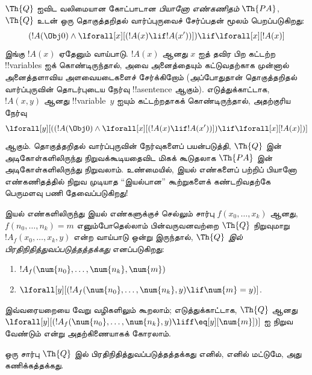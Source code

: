 \documentclass[../../../include/open-logic-section]{subfiles}
\begin{document}
$\Th{Q}$ ஐவிட வலிமையான கோட்பாடான \emph{பியானோ எண்கணிதம்} $\Th{PA}$,
$\Th{Q}$ உடன் ஒரு தொகுத்தறிதல் வார்ப்புருவைச் சேர்ப்பதன் மூலம் பெறப்படுகிறது:
\[
(!A(\Obj 0) \land \lforall[x][(!A(x) \lif !A(x'))]) \lif \lforall[x][!A(x)]
\]
இங்கு $!A(x)$ ஏதேனும் வாய்பாடு. $!A(x)$ ஆனது $x$ ஐத் தவிர பிற கட்டற்ற
!!{variable}s ஐக் கொண்டிருந்தால், அவை அனைத்தையும் கட்டுவதற்காக முன்னால்
அனைத்தளாவிய அளவையடைகளைச் சேர்க்கிறோம் (அப்போதுதான் தொகுத்தறிதல்
வார்ப்புருவின் தொடர்புடைய நேர்வு !!a{sentence} ஆகும்). எடுத்துக்காட்டாக,
$!A(x, y)$ ஆனது !!{variable}~$y$ ஐயும் கட்டற்றதாகக் கொண்டிருந்தால்,
அதற்குரிய நேர்வு
\[
\lforall[y][((!A(\Obj 0) \land \lforall[x][(!A(x) \lif !A(x'))]) \lif
  \lforall[x][!A(x)])]
\]
ஆகும். தொகுத்தறிதல் வார்ப்புருவின் நேர்வுகளைப் பயன்படுத்தி, $\Th{Q}$ இன்
அடிகோள்களிலிருந்து நிறுவக்கூடியதைவிட மிகக் கூடுதலாக $\Th{PA}$ இன்
அடிகோள்களிலிருந்து நிறுவலாம். உண்மையில், இயல் எண்களைப் பற்றிப் பியானோ
எண்கணிதத்தில் நிறுவ முடியாத ``இயல்பான'' கூற்றுகளைக் கண்டறிவதற்கே பெருமளவு
பணி தேவைப்படுகிறது!{}

\begin{defn}
  இயல் எண்களிலிருந்து இயல் எண்களுக்குச் செல்லும் சார்பு
  $f(x_0,\ldots,x_k)$ ஆனது, $f(n_0,\dots,n_k) = m$ எனும்போதெல்லாம்
  பின்வருவனவற்றை $\Th{Q}$ நிறுவுமாறு
  $!A_f(x_0,\dots,x_k,y)$ என்ற வாய்பாடு ஒன்று இருந்தால்,
  {\em $\Th{Q}$ இல் பிரதிநிதித்துவப்படுத்தத்தக்கது} எனப்படுகிறது:
\begin{enumerate}
\item{} $!A_f(\num{n_0}, \dots, \num{n_k}, \num{m})$
\item{} $\lforall[y][(!A_f(\num{n_0}, \dots,
\num{n_k}, y) \lif \num{m} = y)]$.
\end{enumerate}
\end{defn}

இவ்வரையறையை வேறு வழிகளிலும் கூறலாம்; எடுத்துக்காட்டாக, $\Th{Q}$ ஆனது
$\lforall[y][(!A_f(\num{n_0}, \dots, \num{n_k}, y) \liff
\eq[y][\num{m}])]$ ஐ நிறுவ வேண்டும் என்று அதற்கிணையாகக் கோரலாம்.

\begin{thm}
ஒரு சார்பு $\Th{Q}$ இல் பிரதிநிதித்துவப்படுத்தத்தக்கது எனில், எனில்
மட்டுமே, அது கணிக்கத்தக்கது.
\end{thm}
\end{document}
